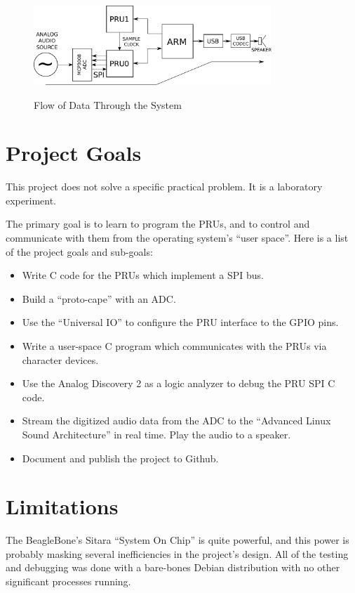 \begin{figure}[H]
	\centering
	\includegraphics[width=0.8\textwidth]{diagrams/data_flow_intro}
	\centering\bfseries
	\caption{Flow of Data Through the System}
\end{figure}

\section{Project Goals}

This project does not solve a specific practical problem.  It is a laboratory experiment.

The primary goal is to learn to program the PRUs, and to control and communicate with them from the operating system's ``user space''.  Here is a list of the project goals and sub-goals:

\begin{itemize}
	\item Write C code for the PRUs which implement a SPI bus.
	\item Build a ``proto-cape'' with an ADC.
	\item Use the ``Universal IO'' to configure the PRU interface to the GPIO pins.
	\item Write a user-space C program which communicates with the PRUs via character devices.
	\item Use the Analog Discovery 2 as a logic analyzer to debug the PRU SPI C code.
	\item Stream the digitized audio data from the ADC to the ``Advanced Linux Sound Architecture'' in real time.  Play the audio to a speaker.
	\item Document and publish the project to Github.
\end{itemize}

\section{Limitations}

The BeagleBone's Sitara ``System On Chip'' is quite powerful, and this power is probably masking several inefficiencies in the project's design.  All of the testing and debugging was done with a bare-bones Debian distribution with no other significant processes running.

